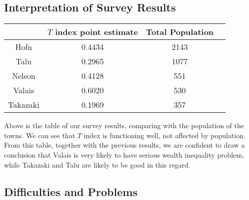 \documentclass[12pt]{article}%
\begin{document}
\subsection{Interpretation of Survey Results}

\begin{center}
        \begin{tabular}{ | c | c | c | c |}
            \hline
                 & $T$ index point estimate 	& Total Population	  \\ 
            \hline
            Hofn 	& 0.4434		& 2143	 \\ 
            \hline 
            Talu & 0.2965 		& 1077	 \\ 
            \hline 
            Nelson & 0.4128 		& 551	 \\ 
            \hline 
            Valais & 0.6020 		& 530	 \\ 
            \hline 
            Takazaki & 0.1969 		& 357	 \\ 
            \hline
        \end{tabular}
\end{center}

Above is the table of our survey results, 
comparing with the population of the towns. 
We can see that $T$ index is functioning well, not affected by population.
From this table, together with the previous results, 
we are confident to draw a conclusion that Valais is very likely to  
have serious wealth inequality problem, 
while Takazaki and Talu are likely to be good in this regard.

\subsection{Difficulties and Problems}
\end{document}
